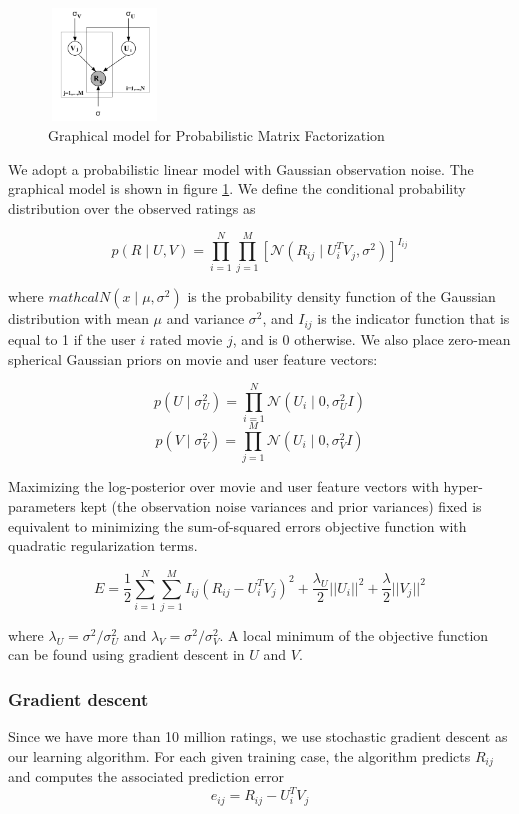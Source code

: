 \documentclass{article} %
\begin{document}
\begin{figure}[ht]
\centering
\includegraphics[width=3cm,height=3cm,keepaspectratio]{pmf_graphical_model.png}
\caption{Graphical model for Probabilistic Matrix Factorization}
\label{fig:pmf_gm}
\end{figure}

We adopt a probabilistic linear model with Gaussian observation noise. The graphical model is shown in figure \ref{fig:pmf_gm}. We define the conditional probability distribution over the observed ratings as

$$ p(R \mid U, V) = \prod_{i=1}^N \prod_{j=1}^M [\mathcal{N} (R_{ij} \mid U_i^T V_j, \sigma^2)]^{I_{ij}} $$

where $mathcal{N}(x \mid \mu, \sigma^2)$ is the probability density function of the Gaussian distribution with mean $\mu$ and variance $\sigma^2$, and $I_{ij}$ is the indicator function that is equal to 1 if the user $i$ rated movie $j$, and is 0 otherwise. We also place zero-mean spherical Gaussian priors on movie and user feature vectors:

$$ p(U \mid \sigma_U^2) = \prod_{i=1}^N \mathcal{N}(U_i \mid 0, \sigma_U^2 I) $$
$$ p(V \mid \sigma_V^2) = \prod_{j=1}^M \mathcal{N}(U_i \mid 0, \sigma_V^2 I) $$

Maximizing the log-posterior over movie and user feature vectors with hyper-parameters kept (the observation noise variances and prior variances) fixed is equivalent to minimizing the sum-of-squared errors objective function with quadratic regularization terms.

$$ E = \frac{1}{2} \sum_{i=1}^N \sum_{j=1}^M I_{ij}(R_{ij} - U_i^T V_j)^2 + \frac{\lambda_U}{2} || U_i ||^2 + \frac{\lambda}{2} ||V_j||^2 $$

where $\lambda_U = \sigma^2/\sigma_U^2$ and $\lambda_V = \sigma^2/\sigma_V^2$. A local minimum of the objective function can be found using gradient descent in $U$ and $V$.

\subsubsection{Gradient descent}

Since we have more than 10 million ratings, we use stochastic gradient descent as our learning algorithm. For each given training case, the algorithm predicts $R_{ij}$ and computes the associated prediction error 
$$e_{ij} = R_{ij} - U_i^T V_j$$
\end{document}
